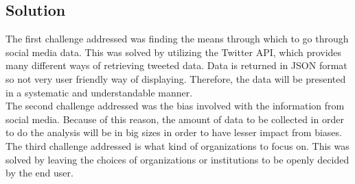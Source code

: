 \documentclass[12pt, titlepage]{article}
\begin{document}
\subsection{Solution}
The first challenge addressed was finding the means through which to go through social media data. This was solved by utilizing the Twitter API, which provides many different ways of retrieving tweeted data. Data is returned in JSON format so not very user friendly way of displaying. Therefore, the data will be presented in a systematic and understandable manner.\\
The second challenge addressed was the bias involved with the information from social media. Because of this reason, the amount of data to be collected in order to do the analysis will be in big sizes in order to have lesser impact from biases. \\
The third challenge addressed is what kind of organizations to focus on. This was solved by leaving the choices of organizations or institutions to be openly decided by the end user. 
\end{document}
